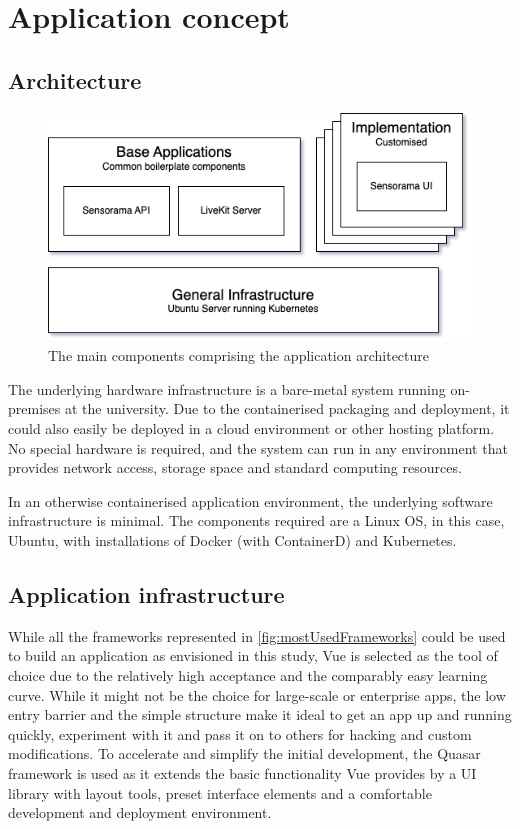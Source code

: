 \chapter{Application concept}
\label{ch:concept}

\section{Architecture}
\label{sec:architecture}

\begin{figure}[h]
\centering
\includegraphics[scale=0.5]{04_Artefakte/01_Abbildungen/sensorama-stack}
\caption[Sensorama stack diagram]{The main components comprising the application architecture\protect}
\label{fig:sensoramaStack}
\end{figure}

The underlying hardware infrastructure is a bare-metal system running on-premises at the university.
Due to the containerised packaging and deployment, it could also easily be deployed in a cloud environment or other hosting platform.
No special hardware is required, and the system can run in any environment that provides network access, storage space and standard computing resources.

In an otherwise containerised application environment, the underlying software infrastructure is minimal.
The components required are a Linux \ac{OS}, in this case, Ubuntu, with installations of Docker (with ContainerD) and Kubernetes.


\section{Application infrastructure}
\label{sec:application-infrastructure}

While all the frameworks represented in \autoref{fig:mostUsedFrameworks} could be used to build an application as envisioned in this study, Vue is selected as the tool of choice due to the relatively high acceptance and the comparably easy learning curve.
While it might not be the choice for large-scale or enterprise apps, the low entry barrier and the simple structure make it ideal to get an app up and running quickly, experiment with it and pass it on to others for hacking and custom modifications.
To accelerate and simplify the initial development, the Quasar framework is used as it extends the basic functionality Vue provides by a \ac{UI} library with layout tools, preset interface elements and a comfortable development and deployment environment.

